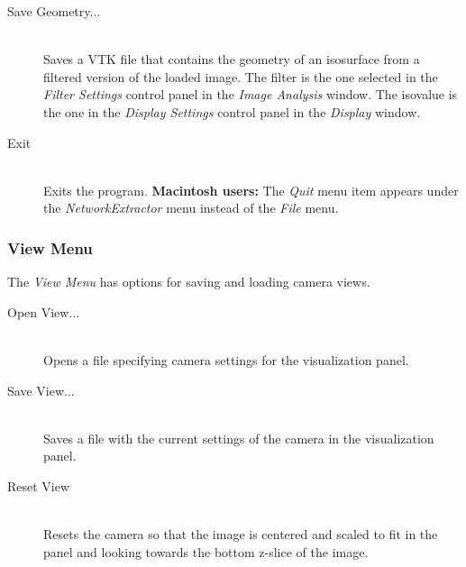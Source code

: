 \documentclass[11pt,titlepage,twoside]{article}
\begin{document}
\begin{description}
  \item[Save Geometry...] \hfill \\
  Saves a VTK file that contains the geometry of an isosurface from a filtered version of the loaded image. The filter is the one selected in the \emph{Filter Settings} control panel in the \emph{Image Analysis} window. The isovalue is the one  in the \emph{Display Settings} control panel in the \emph{Display} window. 
  
  \item[Exit] \hfill \\
  Exits the program. \textbf{Macintosh users:} The \emph{Quit} menu item appears under the \emph{NetworkExtractor} menu instead of the \emph{File} menu.

\end{description}

%
%
%
%
%  
%

\subsubsection{View Menu}
\label{sec:ViewMenu}

The \emph{View Menu} has options for saving and loading camera views.

\begin{description}

  \item[Open View...] \hfill \\
  Opens a file specifying camera settings for the visualization panel.
  
  \item[Save View...] \hfill \\
  Saves a file with the current settings of the camera in the visualization panel.

  \item[Reset View] \hfill \\
  Resets the camera so that the image is centered and scaled to fit in the panel and looking towards the bottom z-slice of the image.
  
\end{description}
\end{document}
